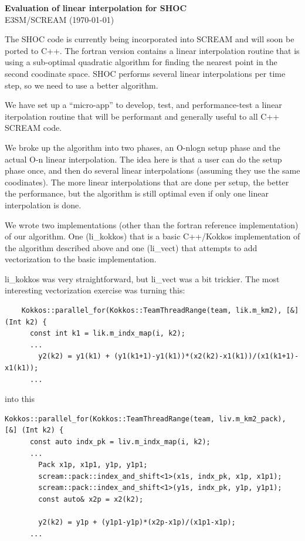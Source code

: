\documentclass[10pt,twocolumn]{article}
\begin{document}
\sloppy

\begin{center}
  {\bf Evaluation of linear interpolation for SHOC} \\
  E3SM/SCREAM (\today)
\end{center}


The SHOC code is currently being incorporated into SCREAM and will soon be ported to
C++. The fortran version contains a linear interpolation routine that is using a
sub-optimal quadratic algorithm for finding the nearest point in the second coodinate
space. SHOC performs several linear interpolations per time step, so we need to
use a better algorithm.

We have set up a ``micro-app'' to develop, test, and performance-test a linear
iterpolation routine that will be performant and generally useful to all C++ SCREAM
code.


We broke up the algorithm into two phases, an O-nlogn setup phase and the actual
O-n linear interpolation. The idea here is that a user can do the setup phase once, and
then do several linear interpolations (assuming they use the same coodinates). The more
linear interpolations that are done per setup, the better the performance, but the algorithm
is still optimal even if only one linear interpolation is done.

We wrote two implementations (other than the fortran reference implementation) of our
algorithm. One (li\_kokkos) that is a basic C++/Kokkos implementation of the algorithm
described above and one (li\_vect) that attempts to add vectorization to the basic implementation.

li\_kokkos was very straightforward, but li\_vect was a bit trickier. The most interesting
vectorization exercise was turning this:

\onecolumn

\begin{verbatim}
    Kokkos::parallel_for(Kokkos::TeamThreadRange(team, lik.m_km2), [&] (Int k2) {
      const int k1 = lik.m_indx_map(i, k2);
      ...
        y2(k2) = y1(k1) + (y1(k1+1)-y1(k1))*(x2(k2)-x1(k1))/(x1(k1+1)-x1(k1));
      ...
\end{verbatim}

into this

\begin{verbatim}
Kokkos::parallel_for(Kokkos::TeamThreadRange(team, liv.m_km2_pack), [&] (Int k2) {
      const auto indx_pk = liv.m_indx_map(i, k2);
      ...
        Pack x1p, x1p1, y1p, y1p1;
        scream::pack::index_and_shift<1>(x1s, indx_pk, x1p, x1p1);
        scream::pack::index_and_shift<1>(y1s, indx_pk, y1p, y1p1);
        const auto& x2p = x2(k2);

        y2(k2) = y1p + (y1p1-y1p)*(x2p-x1p)/(x1p1-x1p);
      ...
\end{verbatim}
\end{document}

